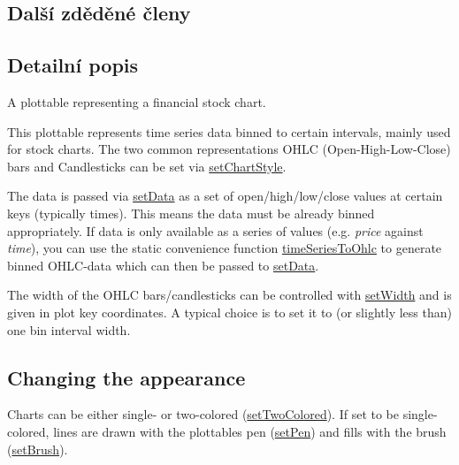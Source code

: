 \subsection*{Další zděděné členy}


\subsection{Detailní popis}
A plottable representing a financial stock chart. 



This plottable represents time series data binned to certain intervals, mainly used for stock charts. The two common representations O\+H\+L\+C (Open-\/\+High-\/\+Low-\/\+Close) bars and Candlesticks can be set via \hyperlink{classQCPFinancial_a5a59175d36279d71596e64d7bb65596f}{set\+Chart\+Style}.

The data is passed via \hyperlink{classQCPFinancial_adf12a86082f1e488df6a4e8603f8fd6d}{set\+Data} as a set of open/high/low/close values at certain keys (typically times). This means the data must be already binned appropriately. If data is only available as a series of values (e.\+g. {\itshape price} against {\itshape time}), you can use the static convenience function \hyperlink{classQCPFinancial_a0c3453d1c03e320950fdd2df54e3ebc8}{time\+Series\+To\+Ohlc} to generate binned O\+H\+L\+C-\/data which can then be passed to \hyperlink{classQCPFinancial_adf12a86082f1e488df6a4e8603f8fd6d}{set\+Data}.

The width of the O\+H\+L\+C bars/candlesticks can be controlled with \hyperlink{classQCPFinancial_a99633f8bac86a61d534ae5eeb1a3068f}{set\+Width} and is given in plot key coordinates. A typical choice is to set it to (or slightly less than) one bin interval width.\hypertarget{classQCPStatisticalBox_appearance}{}\subsection{Changing the appearance}\label{classQCPStatisticalBox_appearance}
Charts can be either single-\/ or two-\/colored (\hyperlink{classQCPFinancial_a138e44aac160a17a9676652e240c5f08}{set\+Two\+Colored}). If set to be single-\/colored, lines are drawn with the plottable\textquotesingle{}s pen (\hyperlink{classQCPAbstractPlottable_ab74b09ae4c0e7e13142fe4b5bf46cac7}{set\+Pen}) and fills with the brush (\hyperlink{classQCPAbstractPlottable_a7a4b92144dca6453a1f0f210e27edc74}{set\+Brush}).

